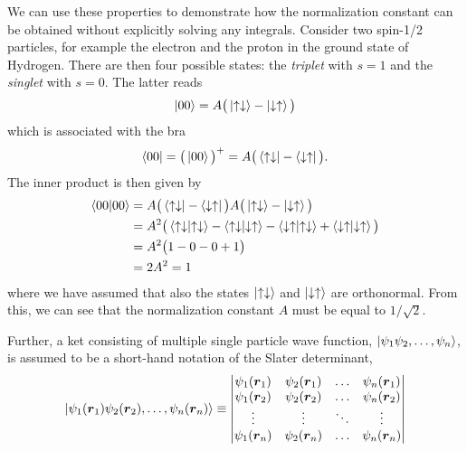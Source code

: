 We can use these properties to demonstrate how the normalization constant can be obtained without explicitly solving any integrals. Consider two spin-1/2 particles, for example the electron and the proton in the ground state of Hydrogen. There are then four possible states: the \textit{triplet} with $s=1$ and the \textit{singlet} with $s=0$. The latter reads \cite{griffiths_introduction_2005}
\begin{equation}
\ket{00}=A\big(\ket{\uparrow\downarrow}-\ket{\downarrow\uparrow}\big)
\end{equation}
which is associated with the bra
\begin{equation}
\bra{00}=\big(\ket{00}\big)^+=A\big(\bra{\uparrow\downarrow}-\bra{\downarrow\uparrow}\big).
\end{equation}
The inner product is then given by
\begin{equation}
\begin{aligned}
\braket{00}{00}&=A\big(\bra{\uparrow\downarrow}-\bra{\downarrow\uparrow}\big)A\big(\ket{\uparrow\downarrow}-\ket{\downarrow\uparrow}\big)\\
&=A^2\big(\braket{\uparrow\downarrow}{\uparrow\downarrow}-\braket{\uparrow\downarrow}{\downarrow\uparrow}-\braket{\downarrow\uparrow}{\uparrow\downarrow}+\braket{\downarrow\uparrow}{\downarrow\uparrow}\big)\\
&=A^2\big(1-0-0+1\big)\\
&=2A^2=1
\end{aligned}
\end{equation}
where we have assumed that also the states $\ket{\uparrow\downarrow}$ and $\ket{\downarrow\uparrow}$ are orthonormal. From this, we can see that the normalization constant $A$ must be equal to $1/\sqrt{2}$.

Further, a ket consisting of multiple single particle wave function, $\ket{\psi_1\psi_2,\hdots,\psi_n}$, is assumed to be a short-hand notation of the Slater determinant,
\begin{equation}
\ket{\psi_1(\bs{r}_1)\psi_2(\bs{r}_2),\hdots,\psi_n(\bs{r}_n)}\equiv
\begin{vmatrix}
\psi_1(\boldsymbol{r}_1) & \psi_2(\boldsymbol{r}_1) & \hdots & \psi_n(\boldsymbol{r}_1)\\
\psi_1(\boldsymbol{r}_2) & \psi_2(\boldsymbol{r}_2) & \hdots & \psi_n(\boldsymbol{r}_2)\\
\vdots & \vdots & \ddots & \vdots \\
\psi_1(\boldsymbol{r}_n) & \psi_2(\boldsymbol{r}_n) & \hdots & \psi_n(\boldsymbol{r}_n)
\end{vmatrix}
\end{equation}